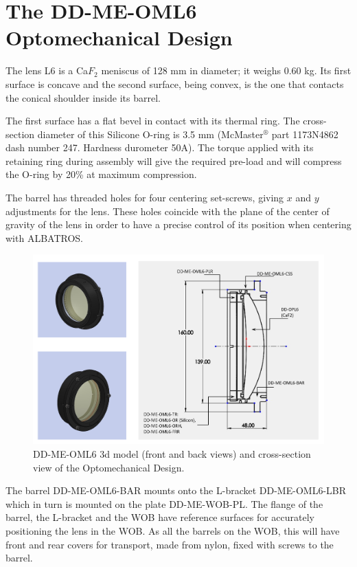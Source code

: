 \documentclass{report}
\begin{document}
\section{The DD-ME-OML6 Optomechanical Design}

The lens L6 is a Ca$F_2$ meniscus of 128 mm in diameter; it weighs 0.60 kg. Its first surface is concave and the second surface, being convex, is the one that contacts the conical shoulder inside its barrel.

The first surface has a flat bevel in contact with its thermal ring. The cross-section diameter of this Silicone O-ring is 3.5 mm (McMaster${}^\circledR$ part 1173N4862 dash number 247. Hardness durometer 50A). The torque applied with its retaining ring during assembly will give the required pre-load and will compress the O-ring by 20\% at maximum compression.

The barrel has threaded holes for four centering set-screws, giving $x$ and $y$ adjustments for the lens. These holes coincide with the plane of the center of gravity of the lens in order to have a precise control of its position when centering with ALBATROS.

\begin{figure}
\begin{center}
\includegraphics[width=1.1\linewidth]{figures/DD-ME-OML6.png}
\end{center}
\caption{DD-ME-OML6 3d model (front and back views) and cross-section view of the Optomechanical Design.}
\label{figure:WOB-OML6}
\end{figure}

The barrel DD-ME-OML6-BAR mounts onto the L-bracket DD-ME-OML6-LBR which in turn is mounted on the plate DD-ME-WOB-PL. The flange of the barrel, the L-bracket and the WOB have reference surfaces for accurately positioning the lens in the WOB. 
As all the barrels on the WOB, this will have front and rear covers for transport, made from nylon, fixed with screws to the barrel.
\end{document}
